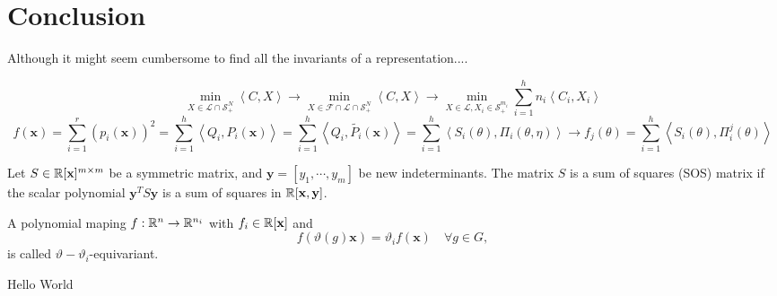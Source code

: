 \documentclass[]{article}
\begin{document}
\section{Conclusion}
Although it might seem cumbersome to find all the invariants of a representation.... 



\[ \min_{X\in\mathcal{L}\cap \mathcal{S}_+^N } \left<C,X\right> \rightarrow 
\min_{X\in\mathcal{F}\cap\mathcal{L}\cap \mathcal{S}_+^N } \left<C,X\right> \rightarrow
\min_{X\in\mathcal{L}, X_i \in \mathcal{S}_+^{m_i} }\sum_{i=1}^{h} n_i\left<C_i,X_i\right>\]
\[f(\mathbf{x}) = \sum_{i= 1}^{r} (p_i(\mathbf{x}))^2 
                = \sum_{i=1}^{h}\left<Q_i,P_i(\mathbf{x})\right> 
                = \sum_{i=1}^{h}\left<Q_i,\tilde{P_i}(\mathbf{x})\right>
                = \sum_{i=1}^{h}\left<S_i(\theta),\Pi_i(\theta,\eta)\right> 
                \rightarrow f_j(\theta) = \sum_{i=1}^{h}\left<S_i(\theta),\Pi_i^j(\theta)\right>  \]

\begin{definition}
    Let $S\in \mathbb R[\textbf{x}]^{m\times m}$ be a symmetric matrix, and $\textbf{y} = [y_1,\cdots,y_m]$ be new indeterminants. The matrix $S$ is a sum of squares (SOS) matrix if the scalar polynomial $\textbf{y}^TS\textbf{y}$ 
    is a sum of squares in $\mathbb R[\textbf{x},\textbf{y}]$.   
\end{definition}

\begin{definition}
    A polynomial maping $f:\mathbb R^n\rightarrow \mathbb R^{n_i}$ with $f_i\in\mathbb R[\mathbf{x}]$ and 
    \[ f(\vartheta(g)\mathbf{x}) =\vartheta_i f(\mathbf{x})\quad \forall g\in G, \]
is called $\vartheta-\vartheta_i$-equivariant.
\end{definition}

\cite{Gatermann_2004}



Hello World
\end{document}
